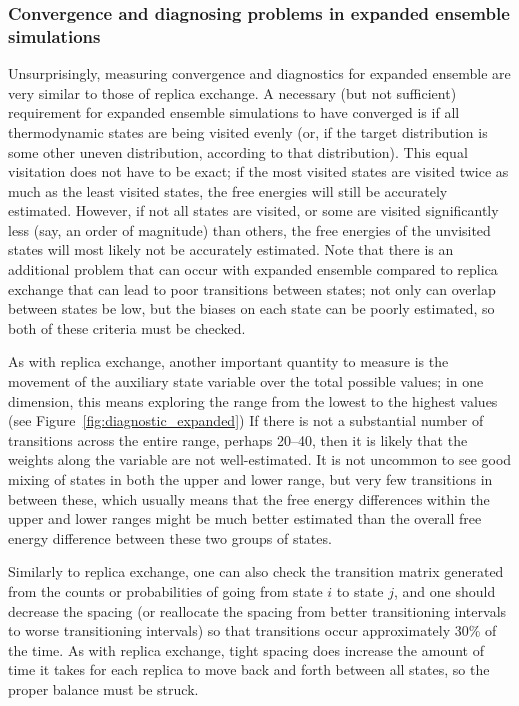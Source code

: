 \documentclass[9pt,review]{livecoms}
\begin{document}
\subsubsection{Convergence and diagnosing problems in expanded ensemble simulations}

Unsurprisingly, measuring convergence and diagnostics for expanded ensemble are very similar to those of replica exchange.  A necessary (but not sufficient) requirement for expanded ensemble simulations to have converged is if all thermodynamic states are being visited evenly (or, if the target distribution is some other uneven distribution, according to that distribution). This equal visitation does not have to be exact; if the most visited states are visited twice as much as the least visited states, the free energies will still be accurately estimated. However, if not all states are visited, or some are visited significantly less (say, an order of magnitude) than others, the free energies of the unvisited states will most likely not be accurately estimated.  Note that there is an additional problem that can occur with expanded ensemble compared to replica exchange that can lead to poor transitions between states; not only can overlap between states be low, but the biases on each state can be poorly estimated, so both of these criteria must be checked.

As with replica exchange, another important quantity to measure is the movement of the auxiliary state variable over the total possible values; in one dimension, this means exploring the range from the lowest to the highest values (see Figure~\ref{fig:diagnostic_expanded}) If there is not a substantial number of transitions across the entire range, perhaps 20--40, then it is likely that the weights along the variable are not well-estimated. It is not uncommon to see good mixing of states in both the upper and lower range, but very few transitions in between these, which usually means that the free energy differences within the upper and lower ranges might be much better estimated than the overall free energy difference between these two groups of states.

Similarly to replica exchange, one can also check the transition matrix generated from the counts or probabilities of going from state $i$ to state $j$, and one should decrease the spacing (or reallocate the spacing from better transitioning intervals to worse transitioning intervals) so that transitions occur approximately 30\% of the time.  As with replica exchange, tight spacing does increase the amount of time it takes for each replica to move back and forth between all states, so the proper balance must be struck.
\end{document}
